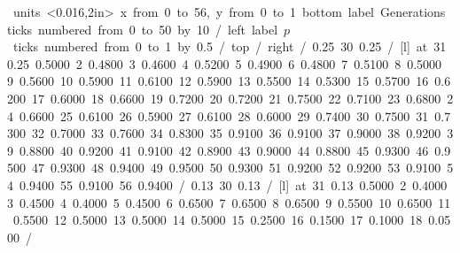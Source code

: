 \centering
  \mbox{%
  \beginpicture \setcoordinatesystem units <0.016\textwidth,2in> 
  \setplotarea x from 0 to 56, y from 0 to 1
  \axis bottom label {Generations}
  ticks numbered from 0 to 50 by 10 /
  \axis left label {$p$}
  ticks numbered  from 0 to 1 by 0.5 /
  \axis top /
  \axis right /
   0.25 30 0.25 /
   [l] at 31 0.25
       0.5000 2        0.4800 3        0.4600 4        0.5200
5       0.4900 6        0.4800 7        0.5100 8        0.5000
9       0.5600 10       0.5900 11       0.6100 12       0.5900
13      0.5500 14       0.5300 15       0.5700 16       0.6200
17      0.6000 18       0.6600 19       0.7200 20       0.7200
21      0.7500 22       0.7100 23       0.6800 24       0.6600
25      0.6100 26       0.5900 27       0.6100 28       0.6000
29      0.7400 30       0.7500 31       0.7300 32       0.7000
33      0.7600 34       0.8300 35       0.9100 36       0.9100
37      0.9000 38       0.9200 39       0.8800 40       0.9200
41      0.9100 42       0.8900 43       0.9000 44       0.8800
45      0.9300 46       0.9500 47       0.9300 48       0.9400
49      0.9500 50       0.9300 51       0.9200 52       0.9200
53      0.9100 54       0.9400 55       0.9100 56       0.9400
/
\setdashes
   0.13 30 0.13 /
   [l] at 31 0.13
 0.5000 2 0.4000 3 0.4500 4 0.4000 5 0.4500 6 0.6500 7 0.6500 8
0.6500 9 0.5500 10 0.6500 11 0.5500 12 0.5000 13 0.5000 14 0.5000 15
0.2500 16 0.1500 17 0.1000 18 0.0500
/
\endpicture}
